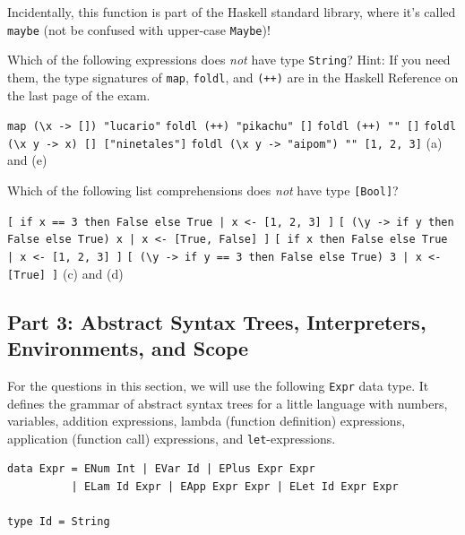 \documentclass[addpoints]{exam}
\begin{document}
\begin{questions}
\begin{solutionorbox}[2in]
Incidentally, this function is part of the Haskell standard library, where it's called \verb|maybe| (not be confused with upper-case \verb|Maybe|)!
  \end{solutionorbox}

  \question[3] Which of the following expressions does \emph{not} have type \verb|String|?  Hint: If you need them, the type signatures of \verb|map|, \verb|foldl|, and \verb|(++)| are in the Haskell Reference on the last page of the exam.

  \begin{choices}
    \CorrectChoice \verb|map (\x -> []) "lucario"|
    \choice \verb|foldl (++) "pikachu" []|
    \choice \verb|foldl (++) "" []|
    \choice \verb|foldl (\x y -> x) [] ["ninetales"]|
    \choice \verb|foldl (\x y -> "aipom") "" [1, 2, 3]|
    \choice (a) and (e)
  \end{choices}

  \question[3] Which of the following list comprehensions does \emph{not} have type \verb|[Bool]|?

  \begin{choices}
    \choice \verb$[ if x == 3 then False else True | x <- [1, 2, 3] ]$
    \choice \verb$[ (\y -> if y then False else True) x | x <- [True, False] ]$
    \CorrectChoice \verb$[ if x then False else True | x <- [1, 2, 3] ]$
    \choice \verb$[ (\y -> if y == 3 then False else True) 3 | x <- [True] ]$
    \choice (c) and (d)
  \end{choices}

\newpage

\subsection*{\textbf{Part 3: Abstract Syntax Trees, Interpreters, Environments, and Scope}}

\noindent For the questions in this section, we will use the following \verb|Expr| data type.  It defines the grammar of abstract syntax trees for a little language with numbers, variables, addition expressions, lambda (function definition) expressions, application (function call) expressions, and \verb|let|-expressions.

\begin{verbatim}
data Expr = ENum Int | EVar Id | EPlus Expr Expr
          | ELam Id Expr | EApp Expr Expr | ELet Id Expr Expr

type Id = String
\end{verbatim}


\end{questions}
\end{document}
